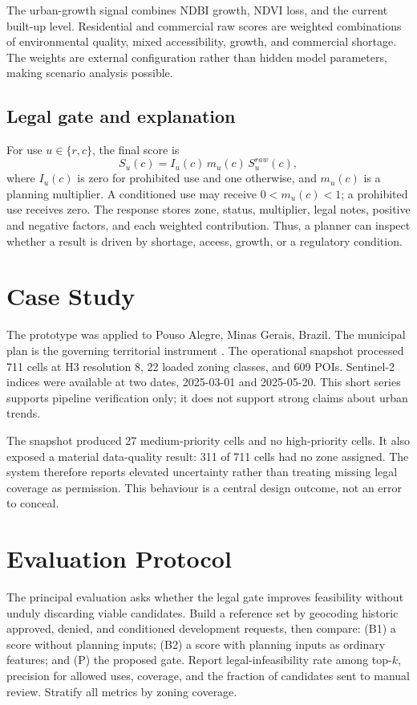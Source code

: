 \documentclass[conference]{IEEEtran}
\begin{document}
The urban-growth signal combines NDBI growth, NDVI loss, and the current built-up level. Residential and commercial raw scores are weighted combinations of environmental quality, mixed accessibility, growth, and commercial shortage. The weights are external configuration rather than hidden model parameters, making scenario analysis possible.

\subsection{Legal gate and explanation}
For use $u\in\{r,c\}$, the final score is
\begin{equation}
S_u(c)=I_u(c)\,m_u(c)\,S^{raw}_u(c),
\end{equation}
where $I_u(c)$ is zero for prohibited use and one otherwise, and $m_u(c)$ is a planning multiplier. A conditioned use may receive $0<m_u(c)<1$; a prohibited use receives zero. The response stores zone, status, multiplier, legal notes, positive and negative factors, and each weighted contribution. Thus, a planner can inspect whether a result is driven by shortage, access, growth, or a regulatory condition.

\section{Case Study}
The prototype was applied to Pouso Alegre, Minas Gerais, Brazil. The municipal plan is the governing territorial instrument \cite{pousoalegre2021}. The operational snapshot processed 711 cells at H3 resolution 8, 22 loaded zoning classes, and 609 POIs. Sentinel-2 indices were available at two dates, 2025-03-01 and 2025-05-20. This short series supports pipeline verification only; it does not support strong claims about urban trends.

The snapshot produced 27 medium-priority cells and no high-priority cells. It also exposed a material data-quality result: 311 of 711 cells had no zone assigned. The system therefore reports elevated uncertainty rather than treating missing legal coverage as permission. This behaviour is a central design outcome, not an error to conceal.

\section{Evaluation Protocol}
The principal evaluation asks whether the legal gate improves feasibility without unduly discarding viable candidates. Build a reference set by geocoding historic approved, denied, and conditioned development requests, then compare: (B1) a score without planning inputs; (B2) a score with planning inputs as ordinary features; and (P) the proposed gate. Report legal-infeasibility rate among top-$k$, precision for allowed uses, coverage, and the fraction of candidates sent to manual review. Stratify all metrics by zoning coverage.
\end{document}
